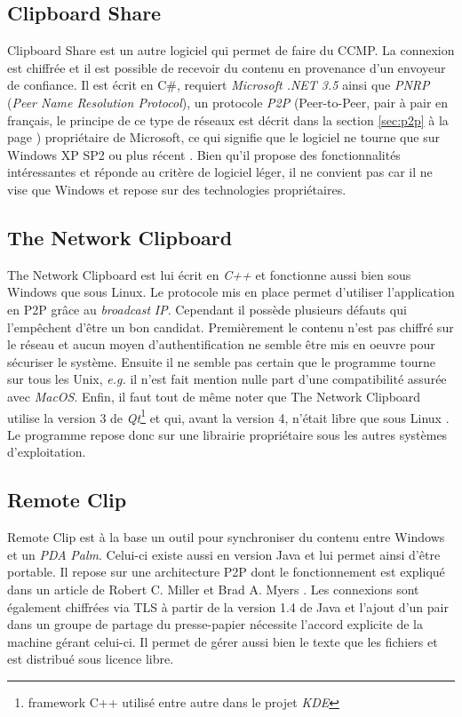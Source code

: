 \subsection{Clipboard Share}
Clipboard Share \cite{clipshare} est un autre logiciel qui permet de faire
du CCMP. La connexion est chiffrée et il est possible de recevoir
du contenu en provenance d'un envoyeur de confiance. Il est écrit en C\#,
requiert \emph{Microsoft .NET 3.5} ainsi que \emph{PNRP} (\emph{Peer Name
Resolution Protocol}), un protocole \emph{P2P} (Peer-to-Peer, pair à pair en
français, le principe de ce type de réseaux est décrit dans la section
\ref{sec:p2p} à la page \pageref{sec:p2p}) propriétaire de Microsoft,
ce qui signifie que le logiciel ne tourne que sur Windows XP SP2 ou plus
récent \cite{wiki:pnrp}. Bien qu'il propose des fonctionnalités intéressantes
et réponde au critère de logiciel léger, il ne convient pas car il ne vise
que Windows et repose sur des technologies propriétaires.

\subsection{The Network Clipboard}
The Network Clipboard \cite{netclip} est lui écrit en \emph{C++} et fonctionne
aussi bien sous Windows que sous Linux. Le protocole mis en place permet
d'utiliser l'application en P2P grâce au \emph{broadcast} \emph{IP}.
Cependant il possède plusieurs défauts qui l'empêchent d'être un bon candidat.
Premièrement le contenu n'est pas chiffré sur le réseau et aucun moyen
d'authentification ne semble être mis en oeuvre pour sécuriser le système.
Ensuite il ne semble pas certain que le programme tourne sur tous les Unix,
\emph{e.g.} il n'est fait mention nulle part d'une compatibilité assurée
avec \emph{MacOS}. Enfin, il faut tout de même noter que The Network
Clipboard utilise la version 3 de \emph{Qt}\footnote{framework C++ utilisé
entre autre dans le projet \emph{KDE}} et qui, avant la version 4, n'était
libre que sous Linux \cite{wiki:qt}.
Le programme repose donc sur une librairie propriétaire sous les autres
systèmes d'exploitation.

\subsection{Remote Clip}
Remote Clip \cite{remoteclip} est à la base un outil pour synchroniser
du contenu entre Windows et un \emph{PDA} \emph{Palm}. Celui-ci existe
aussi en version Java et lui permet ainsi d'être portable. Il repose sur une
architecture P2P dont le fonctionnement est expliqué dans un article de Robert
C. Miller et Brad A. Myers \cite{Miller99syncclips}. Les connexions sont
également chiffrées via TLS à partir de la version 1.4 de Java et
l'ajout d'un pair dans un groupe de partage du presse-papier nécessite
l'accord explicite de la machine gérant celui-ci. Il permet de gérer aussi
bien le texte que les fichiers et est distribué sous licence libre.

